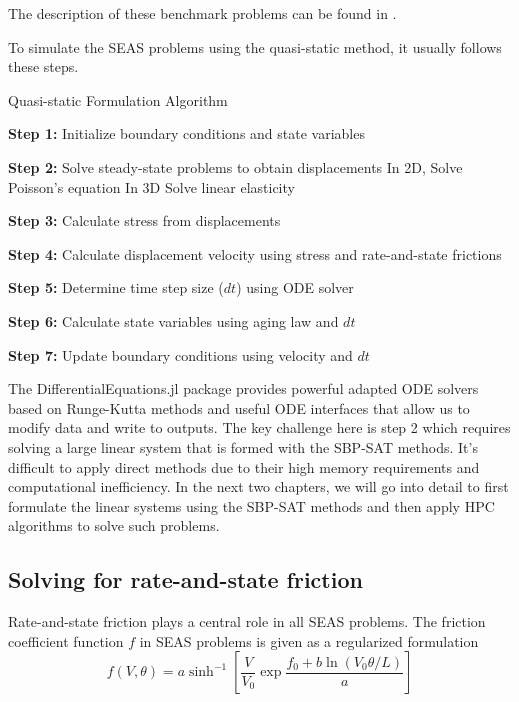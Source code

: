The description of these benchmark problems can be found in \cite{erickson2018seas,jiang2020seas}.

To simulate the SEAS problems using the quasi-static method, it usually follows these steps.

\begin{algorithm}
    \caption{Quasi-static Formulation Algorithm}
    \begin{algorithmic}[1]
        \State \textbf{Step 1:} Initialize boundary conditions and state variables
        
            \State \textbf{Step 2:} Solve steady-state problems to obtain displacements
            \State \hspace{1em} In 2D, Solve Poisson's equation
            \State \hspace{1em} In 3D Solve linear elasticity
            
            \State \textbf{Step 3:} Calculate stress from displacements
            
            \State \textbf{Step 4:} Calculate displacement velocity using stress and rate-and-state frictions
            
            \State \textbf{Step 5:} Determine time step size ($dt$) using ODE solver
            
            \State \textbf{Step 6:} Calculate state variables using aging law and $dt$
            
            \State \textbf{Step 7:} Update boundary conditions using velocity and $dt$
        \EndWhile
    \end{algorithmic}
\end{algorithm}

The DifferentialEquations.jl package provides powerful adapted ODE solvers based on Runge-Kutta methods and useful ODE interfaces that allow us to modify data and write to outputs.
The key challenge here is step 2 which requires solving a large linear system that is formed with the SBP-SAT methods.
It's difficult to apply direct methods due to their high memory requirements and computational inefficiency. 
In the next two chapters, we will go into detail to first formulate the linear systems using the SBP-SAT methods and then apply HPC algorithms to solve such problems.


\subsection{Solving for rate-and-state friction}
Rate-and-state friction plays a central role in all SEAS problems. 
The friction coefficient function $f$ in SEAS problems is given as a regularized formulation
\begin{equation}
    f(V, \theta) = a \sinh^{-1} [\frac{V}{V_0} \exp{\frac{f_0 + b \ln(V_0 \theta / L)}{a}}]
    \label{eqn:friction-coefficient}
\end{equation}

